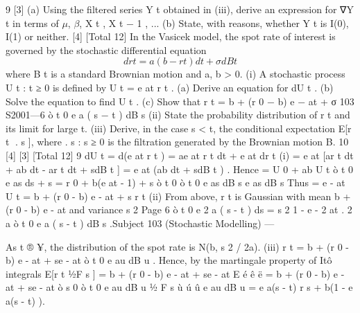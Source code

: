 9
[3]
(a) Using the filtered series {Y t } obtained in (iii), derive an expression
for ∇Y t in terms of $\mu$, $\beta$, X t , X t − 1 , ...
(b) State, with reasons, whether {Y t } is I(0), I(1) or neither.
[4]
[Total 12]
In the Vasicek model, the spot rate of interest is governed by the stochastic
differential equation
\[dr t = a(b − r t ) dt + σdB t\]
where B t is a standard Brownian motion and a, b > 0.
(i)
A stochastic process {U t : t ≥ 0} is defined by U t = e at r t .
(a) Derive an equation for dU t .
(b) Solve the equation to find U t .
(c) Show that
r t = b + (r 0 − b) e − at + σ
103 S2001—6
ò
t
0
e a ( s − t ) dB s
(ii) State the probability distribution of r t and its limit for large t.
(iii) Derive, in the case s < t, the conditional expectation E[r t . s ], where {. s : s ≥ 0} is the filtration generated by the Brownian motion B.
10
[4]
[3]
[Total 12]
9
dU t = d(e at r t ) = ae at r t dt + e at dr t
(i)
= e at [ar t dt + ab dt - ar t dt + sdB t ]
= e at (ab dt + sdB t ) .
Hence
= U 0 + ab
U t
ò
t
0
e as ds + s
= r 0 + b(e at - 1) + s
ò
t
0
ò
t
0
e as dB s
e as dB s
Thus
= e - at U t = b + (r 0 - b) e - at + s
r t
(ii)
From above, r t is Gaussian
with mean b + (r 0 - b) e - at and variance
s 2
Page 6
ò
t
0
e 2 a ( s - t ) ds = s 2
1 - e - 2 at
.
2 a
ò
t
0
e a ( s - t ) dB s .Subject 103 (Stochastic Modelling) — 

As t ® ¥, the distribution of the spot rate is N(b, s 2 / 2a).
(iii)
r t
= b + (r 0 - b) e - at + se - at
ò
t
0
e au dB u .
Hence, by the martingale property of Itô integrals
E[r t 1⁄2F s ] = b + (r 0 - b) e - at + se - at E é ê
ë
= b + (r 0 - b) e - at + se - at
ò
s
0
ò
t
0
e au dB u 1⁄2 F s ù ú
û
e au dB u
= e a(s - t) r s + b(1 - e a(s - t) ).

